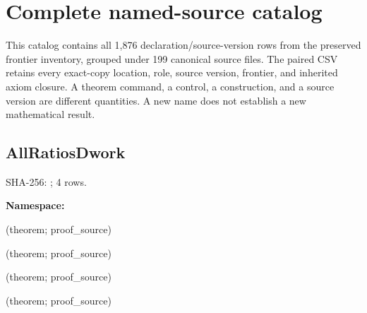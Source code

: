 \section{Complete named-source catalog}\label{sec:catalog}
This catalog contains all 1,876 declaration/source-version rows from the preserved frontier inventory, grouped under 199 canonical source files. The paired CSV retains every exact-copy location, role, source version, frontier, and inherited axiom closure. A theorem command, a control, a construction, and a source version are different quantities. A new name does not establish a new mathematical result.
\subsection*{AllRatiosDwork}
{\footnotesize SHA-256: ; 4 rows.}\par
\begingroup\small
\textbf{Namespace:} \par
\noindent{} {\scriptsize (theorem; proof\_source)}\par
\noindent{} {\scriptsize (theorem; proof\_source)}\par
\noindent{} {\scriptsize (theorem; proof\_source)}\par
\noindent{} {\scriptsize (theorem; proof\_source)}\par
\endgroup
